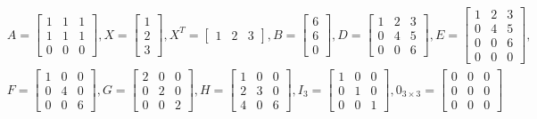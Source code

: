 

\begin{align*}
	&A =
	\begin{bmatrix}
		1 & 1 & 1\\
		1 & 1 & 1\\
		0 & 0 & 0
	\end{bmatrix},
	X =
	\begin{bmatrix*}
		1\\
		2\\
		3
	\end{bmatrix*},
	X^T =
	\begin{bmatrix*}
		1 & 2 & 3
	\end{bmatrix*},
	B =
	\begin{bmatrix*}
		6\\
		6\\
		0
	\end{bmatrix*},
	D =
	\begin{bmatrix}
		1 & 2 & 3\\
		0 & 4 & 5\\
		0 & 0 & 6
	\end{bmatrix},
	E =
	\begin{bmatrix}
		1 & 2 & 3\\
		0 & 4 & 5\\
		0 & 0 & 6\\
		0 & 0 & 0
	\end{bmatrix}, \\
	&F =
	\begin{bmatrix}
		1 & 0 & 0\\
		0 & 4 & 0\\
		0 & 0 & 6
	\end{bmatrix},
	G =
	\begin{bmatrix*}
		2 & 0 & 0\\
		0 & 2 & 0\\
		0 & 0 & 2
	\end{bmatrix*},
	H =
	\begin{bmatrix}
		1 & 0 & 0\\
		2 & 3 & 0\\
		4 & 0 & 6
	\end{bmatrix},
	I_3 =
	\begin{bmatrix}
		1 & 0 & 0\\
		0 & 1 & 0\\
		0 & 0 & 1
	\end{bmatrix},
	0_{3 \times 3} =
	\begin{bmatrix}
		0 & 0 & 0\\
		0 & 0 & 0\\
		0 & 0 & 0
	\end{bmatrix}
\end{align*}

